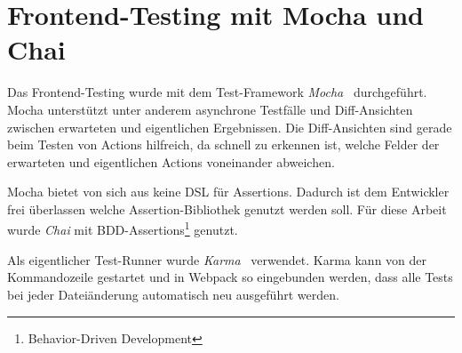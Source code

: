 \section{Frontend-Testing mit Mocha und Chai}
\label{sec:t_frontend_testing_mit_mocha_und_chai'}

Das Frontend-Testing wurde mit dem Test-Framework \emph{Mocha}~\cite{mocha}
durchgeführt.  Mocha unterstützt unter anderem asynchrone Testfälle und
Diff-Ansichten zwischen erwarteten und eigentlichen Ergebnissen.
Die Diff-Ansichten sind gerade beim Testen von Actions hilfreich, da schnell zu
erkennen ist, welche Felder der erwarteten und eigentlichen Actions voneinander
abweichen.

Mocha bietet von sich aus keine DSL für Assertions.  Dadurch ist dem Entwickler
frei überlassen welche Assertion-Bibliothek genutzt werden soll.  Für diese
Arbeit wurde \emph{Chai} mit BDD-Assertions\footnote{Behavior-Driven
Development} genutzt.

Als eigentlicher Test-Runner wurde \emph{Karma}~\cite{karma} verwendet.  Karma
kann von der Kommandozeile gestartet und in Webpack so eingebunden werden, dass
alle Tests bei jeder Dateiänderung automatisch neu ausgeführt werden.



